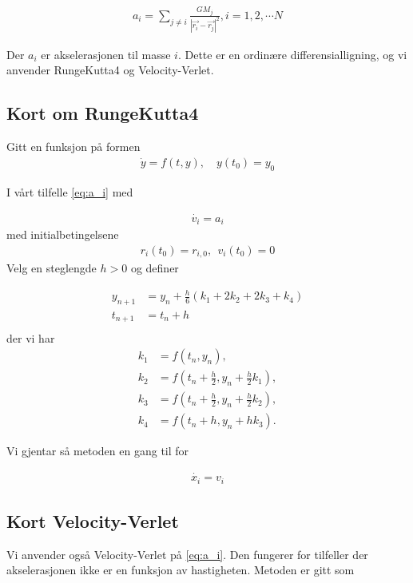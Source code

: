 \documentclass[11pt, twocolumn]{article}
\begin{document}
\begin{align} \label{eq:a_i}
a_i = \sum_{j \neq i} \frac{GM_j}{{|\vec{r_i} - \vec{r_j}|}^2} ,  i = 1,2, \cdots N 
\end{align}

Der $a_i$ er akselerasjonen til masse $i$. Dette er en ordinære differensialligning, og
vi anvender RungeKutta4 og Velocity-Verlet.

\subsection{Kort om RungeKutta4~\small{\cite{RK4}}}
Gitt en funksjon på formen 
\begin{align*}
\dot{y} = f(t, y), \quad y(t_0) = y_0
\end{align*}

I vårt tilfelle \eqref{eq:a_i} med 

\begin{align*}
\dot{v_i} = a_i 
\end{align*}
med initialbetingelsene
\begin{align*}
r_i(t_0) = r_{i,0},\ \  v_i(t_0) = 0
\end{align*}
Velg en steglengde $h>0$ og definer 

\begin{align*}
y_{n+1} &= y_n + \tfrac{h}{6}\left(k_1 + 2k_2 + 2k_3 + k_4 \right)\\
t_{n+1} &= t_n + h \\
\end{align*}
der vi har
\begin{align*}
k_1 &= f(t_n, y_n), \\
k_2 &= f(t_n + \tfrac{h}{2}, y_n + \tfrac{h}{2} k_1), \\
k_3 &= f(t_n + \tfrac{h}{2}, y_n + \tfrac{h}{2} k_2), \\
k_4 &= f(t_n + h, y_n + hk_3).
\end{align*}

Vi gjentar så metoden en gang til for 

\begin{align*}
\dot{x_i} = v_i
\end{align*}

\subsection{Kort Velocity-Verlet~\small{\cite{Velocity-Verlet}}}
Vi anvender også Velocity-Verlet på \eqref{eq:a_i}. Den fungerer for tilfeller der 
akselerasjonen ikke er en funksjon av hastigheten. 
Metoden er gitt som
\end{document}
